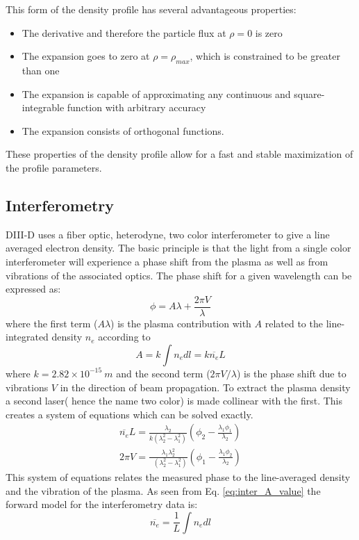 \documentclass[12pt]{article}
\numberwithin{equation}{section}
\begin{document}
This form of the density profile has several advantageous properties:
\begin{itemize}
	\item The derivative and therefore the particle flux at $\rho = 0$ is zero
	\item The expansion goes to zero at $\rho = \rho_{max}$, which is constrained to be greater than one  
	\item The expansion is capable of approximating any continuous and square-integrable function with arbitrary accuracy
	\item The expansion consists of orthogonal functions.
\end{itemize}
These properties of the density profile allow for a fast and stable 
maximization of the profile parameters. 
\subsection{Interferometry}
DIII-D uses a fiber optic, heterodyne, two color interferometer to 
give a line averaged electron density.\cite{van2006fiber} The basic 
principle is that the light from a single color interferometer will 
experience a phase shift from the plasma as well as from vibrations of 
the associated optics. The phase shift for a given wavelength can be 
expressed as:
\begin{equation} \label{eq:inter_phase}
	\phi = A \lambda + \frac{2\pi V}{\lambda}
\end{equation}
where the first term ($A\lambda$) is the plasma contribution with $A$ 
related to the line-integrated density $n_e$ according to
\begin{equation} \label{eq:inter_A_value}
	A = k \int n_e dl = k\overline{n_e}L
\end{equation}
where $k=2.82 \times 10^{-15} \:m$ and the second term ($2\pi V/
\lambda$) is the phase shift due to vibrations $V$ in the direction 
of beam propagation. To extract the plasma density a second laser( 
hence the name two color) is made collinear with the first. This 
creates a system of equations which can be solved exactly.
\begin{align} \label{eq:inter_system}
	\overline{n_e} L = \frac{\lambda_2}{k(\lambda_2^2 - \lambda_1^2)}\left( \phi_2 - \frac{\lambda_1 \phi_1}{\lambda_2}\right) \\ 
	2\pi V = \frac{\lambda_1 \lambda_2^2}{\:\:\,(\lambda_2^2 - \lambda_1^2)}\left( \phi_1 - \frac{\lambda_1 \phi_2}{\lambda_2}\right)
\end{align}
This system of equations relates the measured phase to the line-averaged density and the vibration of the plasma. 
As seen from Eq. \ref{eq:inter_A_value} the forward model for the 
interferometry data is:
\begin{equation} \label{eq:inter_model}
	\overline{n_e} = \frac{1}{L} \int n_e dl
\end{equation}
\end{document}

